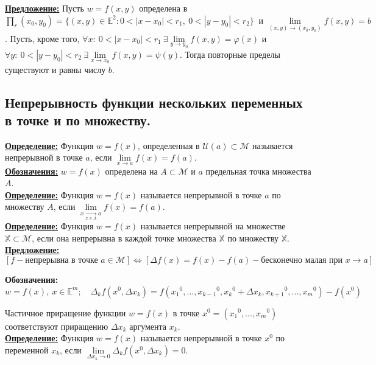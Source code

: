 \documentclass[a4paper,12pt]{article} %
\begin{document}
\underline{\textbf{Предложение:}} Пусть $w = f(x, y)$ определена в 	$\prod_r(x_0, y_0) = 
\{(x,y) \in \mathds{E}^2: 0 < |x - x_0| < r_1, ~ 0 < |y - y_0| < r_2\} ~ \text{ и } \lim\limits_{(x, y) \to (x_0, y_0)}f(x, y) = b$. Пусть, кроме того, $\forall x: ~
0 < |x - x_0| < r_1 ~ \exists \lim\limits_{y \to y_0}f(x, y) = \varphi(x)$ и 
$\forall y: ~ 0 < |y - y_0| < r_2 ~ \exists \lim\limits_{x \to x_0}f(x, y) = \psi(y)$.
Тогда повторные пределы существуют и равны числу $b$.


\subsection{Непрерывность функции нескольких переменных в точке и по множеству.}
\underline{\textbf{Определение:}} Функция $w = f(x)$, определенная в $\mathscr{U}(a) \subset \mathscr{M}$ называется непрерывной в точке $a$, если $\lim\limits_{x \to a}f(x) = f(a)$.\\

\underline{\textbf{Обозначения:}} $ w = f(x)$ определена на $A \subset \mathscr{M}$ и $a$ предельная точка множества $A$.\\

\underline{\textbf{Определение:}} Функция $w = f(x)$ называется непрерывной в точке $a$ по
множеству $A$, если $\lim\limits_{x \xrightarrow[x \in A]{} a}f(x) = f(a)$.\\

\underline{\textbf{Определение:}} Функция $w = f(x)$ называется непрерывной на множестве 
$\mathbb{X} \subset \mathscr{M}$, если она непрерывна в каждой точке множества 
$\mathbb{X}$ по множеству $\mathbb{X}$.\\

\underline{\textbf{Предложение:}} 
\[[f - \text{непрерывна в точке }a \in \mathscr{M}] \Leftrightarrow [\Delta f(x) = f(x) - f(a) - \text{бесконечно малая при } x \to a]\]

\textbf{Обозначения:} 
\[w = f(x), ~ x \in \mathbb{E}^m; \quad \Delta_kf(x^0, \Delta x_k) = f({x_1}^0, ..., {x_{k-1}}^0, {x_{k}}^0 + \Delta x_k, {x_{k+1}}^0, ..., {x_{m}}^0) - f(x^0)\]

Частичное приращение функции $w = f(x)$ в точке $x^0 = ({x_1}^0, ..., {x_m}^0)$ соответствуют приращению $\Delta x_k$ аргумента $x_k$.\\

\underline{\textbf{Определение:}} Функция $w = f(x)$ называется непрерывной в точке $x^0$ по переменной $x_k$, если $\lim\limits_{\Delta x_k \to 0}\Delta_k f(x^0, \Delta x_k) = 0$.\\
\end{document}
